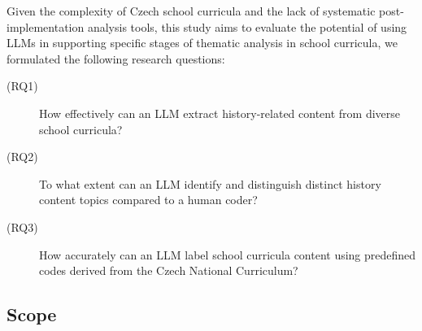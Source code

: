 \documentclass[]{interact}
\theoremstyle{plain}%
\theoremstyle{definition}
\theoremstyle{remark}
\begin{document}

Given the complexity of Czech school curricula and the lack of systematic post-implementation analysis tools, this study aims to evaluate the potential of using LLMs in supporting specific stages of thematic analysis in school curricula, we formulated the following research questions:

\begin{description}
	\item[(RQ1)] How effectively can an LLM extract history-related content from diverse school curricula?  
    \item[(RQ2)] To what extent can an LLM identify and distinguish distinct history content topics compared to a human coder?  
    \item[(RQ3)] How accurately can an LLM label school curricula content using predefined codes derived from the Czech National Curriculum?  
\end{description}


\subsection{Scope}




\end{document}
